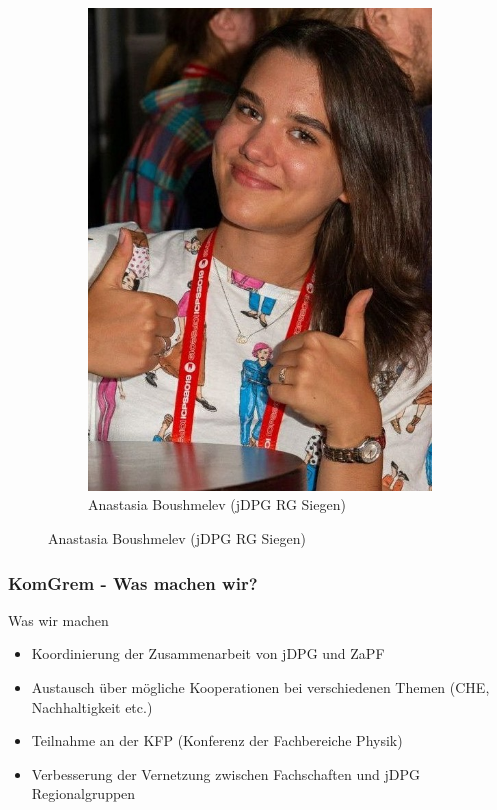 \documentclass[compress, aspectratio=169]{beamer}
\begin{document}
\begin{frame}
\begin{figure}
\begin{subfigure}[t]{0.24\textwidth}
         \includegraphics[height=.5\textheight]{boushmelev.jpg}
         \caption*{Anastasia Boushmelev (jDPG RG Siegen)}
     \end{subfigure}
  \end{figure}
 \end{frame}
 
 \begin{frame}\frametitle{KomGrem - Was machen wir?}
 
   \begin{block}{Was wir machen}
     \begin{itemize}
       \item Koordinierung der Zusammenarbeit von jDPG und ZaPF
       \item Austausch über mögliche Kooperationen bei verschiedenen Themen (CHE, Nachhaltigkeit etc.)
       \item Teilnahme an der KFP (Konferenz der Fachbereiche Physik)
       \item Verbesserung der Vernetzung zwischen Fachschaften und jDPG Regionalgruppen
     \end{itemize}
   \end{block}
 \end{frame}
\end{document}
